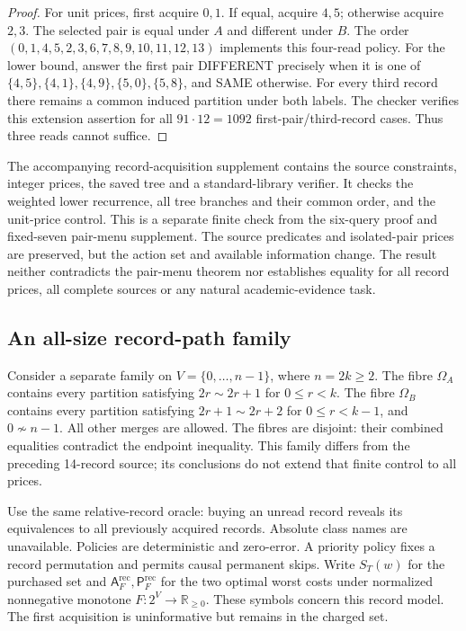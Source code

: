 \documentclass[pdflatex,sn-mathphys-num]{sn-jnl}
\newcommand{\A}{\mathsf{A}}
\newcommand{\Pcost}{\mathsf{P}}
\theoremstyle{thmstyleone}
\theoremstyle{thmstylethree}
\theoremstyle{thmstyletwo}
\begin{document}
\begin{proof}
For unit prices, first acquire $0,1$. If equal, acquire $4,5$; otherwise acquire $2,3$. The selected pair is equal under $A$ and different under $B$. The order $(0,1,4,5,2,3,6,7,8,9,10,11,12,13)$ implements this four-read policy. For the lower bound, answer the first pair DIFFERENT precisely when it is one of $\{4,5\},\{4,1\},\{4,9\},\{5,0\},\{5,8\}$, and SAME otherwise. For every third record there remains a common induced partition under both labels. The checker verifies this extension assertion for all $91\cdot12=1092$ first-pair/third-record cases. Thus three reads cannot suffice.
\end{proof}

The accompanying record-acquisition supplement contains the source constraints, integer prices, the saved tree and a standard-library verifier. It checks the weighted lower recurrence, all tree branches and their common order, and the unit-price control. This is a separate finite check from the six-query proof and fixed-seven pair-menu supplement. The source predicates and isolated-pair prices are preserved, but the action set and available information change. The result neither contradicts the pair-menu theorem nor establishes equality for all record prices, all complete sources or any natural academic-evidence task.

\subsection{An all-size record-path family}\label{sec:record-path}
Consider a separate family on $V=\{0,\ldots,n-1\}$, where $n=2k\geq2$. The fibre $\Omega_A$ contains every partition satisfying $2r\sim2r+1$ for $0\leq r<k$. The fibre $\Omega_B$ contains every partition satisfying $2r+1\sim2r+2$ for $0\leq r<k-1$, and $0\not\sim n-1$. All other merges are allowed. The fibres are disjoint: their combined equalities contradict the endpoint inequality. This family differs from the preceding 14-record source; its conclusions do not extend that finite control to all prices.

Use the same relative-record oracle: buying an unread record reveals its equivalences to all previously acquired records. Absolute class names are unavailable. Policies are deterministic and zero-error. A priority policy fixes a record permutation and permits causal permanent skips. Write $S_T(w)$ for the purchased set and $\A_F^{\mathrm{rec}},\Pcost_F^{\mathrm{rec}}$ for the two optimal worst costs under normalized nonnegative monotone $F:2^V\to\mathbb R_{\geq0}$. These symbols concern this record model. The first acquisition is uninformative but remains in the charged set.
\end{document}
